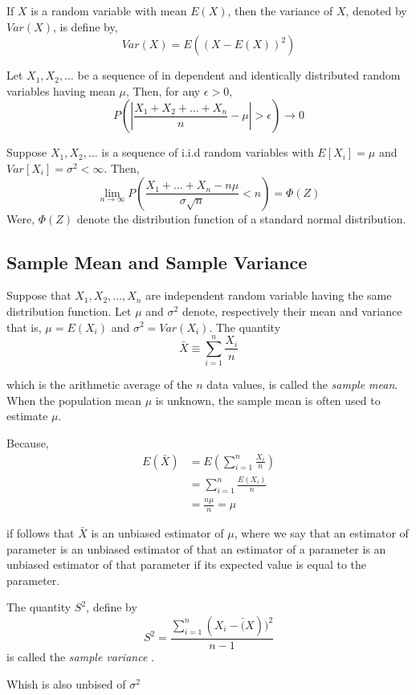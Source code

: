 \begin{definition}[Variance]
	If $ X $ is a random variable with mean $ E(X) $, then the variance of $ X $,
	denoted by $ Var(X) $, is define by,
	\[
		Var(X)=E\left( (X-E(X))^{2} \right)
	\]
\end{definition}

\begin{theorem}
	Let $X_1,X_2,\ldots$ be a sequence of in dependent and identically distributed 
	random variables having mean $ \mu $, Then, for any $ \epsilon >0 $,
	\[
		P \left( \left|\frac{X_1+X_2+ \ldots + X_n }{n} - \mu \right| > \epsilon \right) \to 0 
	\]
\end{theorem}

\begin{theorem}
	Suppose $X_1, X_2, \ldots  $ is a sequence of i.i.d random variables with 
	$E[X_i]=\mu$ and $Var[X_i]=\sigma ^{2} < \infty$. Then, 
	\[
		\lim_{n \to \infty} P\left( \frac{X_1+\ldots+X_n - n\mu}{\sigma \sqrt{n } } < n \right) = \Phi(Z)
	\]
	Were, $\Phi(Z)$ denote the distribution function of a standard normal distribution.
\end{theorem}

\subsection*{Sample Mean and Sample Variance}
Suppose that $ X_1,X_2,\ldots,X_n $ are independent random variable having the same
distribution function. Let $ \mu $ and $ \sigma ^{2} $ denote, respectively 
their mean and variance that is, $ \mu = E(X_i) $ and $ \sigma ^{2} = Var(X_i) $.
The quantity
\[
	\bar{X} \equiv \sum_{i=1}^{n} \frac{X_i}{n}
\]

which is the arithmetic average of the $ n $ data values, is called the \textit{sample mean}.
When the population mean $ \mu $ is unknown, the sample mean is often used to estimate $ \mu .$

Because, 
\begin{align*}
	E(\bar{X}) & = E\left( \sum_{i=1}^{n} \frac{X_i}{n} \right) \\ 
	           & = \sum_{i=1}^{n} \frac{E(X_i)}{n}              \\ 
	           & = \frac{n \mu}{n} = \mu
\end{align*}

if follows that $ \bar{X} $ is an unbiased estimator of $ \mu $, where we say that an estimator
of parameter is an unbiased estimator of that an estimator of a parameter is an unbiased estimator
of that parameter if its expected value is equal to the parameter.

The quantity $ S ^{2} $, define by 
\[
	S ^{2} = \frac{\sum_{i=1}^{n}(X_i - \bar(X))^{2} }{n-1}
\]
is called the \textit{sample variance} .

Whish is also unbised of $ \sigma ^{2} $

